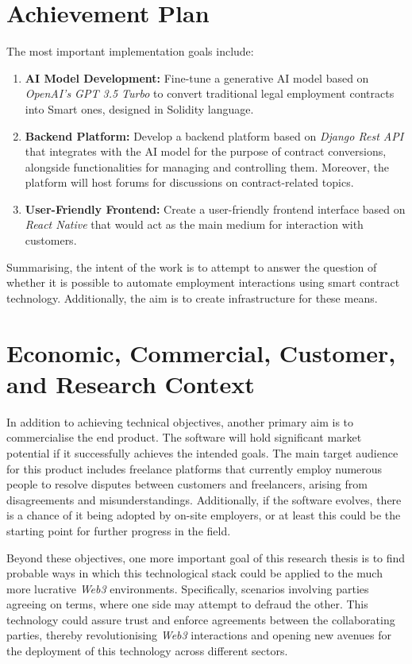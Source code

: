 \section{Achievement Plan}

The most important implementation goals include:

\begin{enumerate}
    \item \textbf{AI Model Development:} Fine-tune a generative AI model based on \textit{OpenAI's GPT 3.5 Turbo} to convert traditional legal employment contracts into Smart ones, designed in Solidity language.
    \item \textbf{Backend Platform:} Develop a backend platform based on \textit{Django Rest API} that integrates with the AI model for the purpose of contract conversions, alongside functionalities for managing and controlling them. Moreover, the platform will host forums for discussions on contract-related topics.
    \item \textbf{User-Friendly Frontend:} Create a user-friendly frontend interface based on \textit{React Native} that would act as the main medium for interaction with customers.
\end{enumerate} 

Summarising, the intent of the work is to attempt to answer the question of whether it is possible to automate employment interactions using smart contract technology. Additionally, the aim is to create infrastructure for these means. 

\section{Economic, Commercial, Customer, and Research Context}

In addition to achieving technical objectives, another primary aim is to commercialise the end product. The software will hold significant market potential if it successfully achieves the intended goals. The main target audience for this product includes freelance platforms that currently employ numerous people to resolve disputes between customers and freelancers, arising from disagreements and misunderstandings. Additionally, if the software evolves, there is a chance of it being adopted by on-site employers, or at least this could be the starting point for further progress in the field.

Beyond these objectives, one more important goal of this research thesis is to find probable ways in which this technological stack could be applied to the much more lucrative \textit{Web3} environments. Specifically, scenarios involving parties agreeing on terms, where one side may attempt to defraud the other. This technology could assure trust and enforce agreements between the collaborating parties, thereby revolutionising \textit{Web3} interactions and opening new avenues for the deployment of this technology across different sectors.

